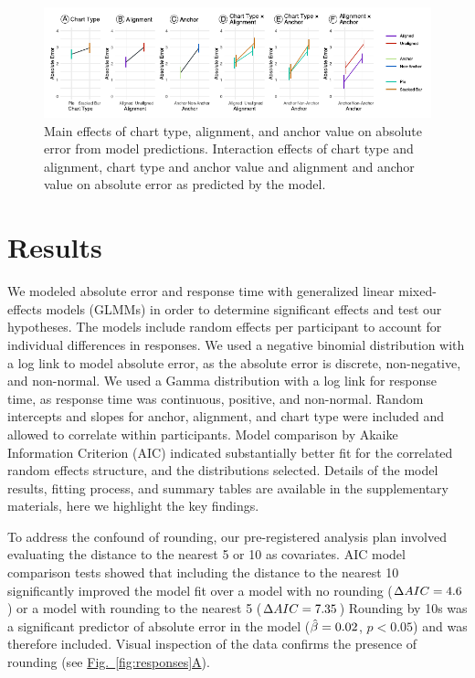 \documentclass[preprint]{vgtc}               %
\newcommand{\FlatCircledText}[1]{\smash{\CircledText{#1}}}
\newcommand{\subfigref}[2]{\hyperref[#1]{Fig.~\ref*{#1}#2}}
\begin{document}
\begin{figure}[t]
    \centering
    \includegraphics[width=\textwidth]{resultsFigure.pdf}
    \caption{Main effects of \FlatCircledText{A} chart type, \FlatCircledText{B} alignment, and \FlatCircledText{C} anchor value on absolute error from model predictions. Interaction effects of \FlatCircledText{D} chart type and alignment, \FlatCircledText{E} chart type and anchor value and \FlatCircledText{F} alignment and anchor value on absolute error as predicted by the model.}
    \label{fig:results}
\end{figure}

\section{Results}
We modeled absolute error and response time with generalized linear mixed-effects models (GLMMs) in order to determine significant effects and test our hypotheses.
The models include random effects per participant to account for individual differences in responses.
We used a negative binomial distribution with a log link to model absolute error, as the absolute error is discrete, non-negative, and non-normal. 
We used a Gamma distribution with a log link for response time, as response time was continuous, positive, and non-normal.
Random intercepts and slopes for anchor, alignment, and chart type were included and allowed to correlate within participants. 
Model comparison by Akaike Information Criterion (AIC) indicated substantially better fit for the correlated random effects structure, and the distributions selected.
Details of the model results, fitting process, and summary tables are available in the supplementary materials, here we highlight the key findings. 

To address the confound of rounding, our pre-registered analysis plan involved evaluating the distance to the nearest 5 or 10 as covariates.
AIC model comparison tests showed that including the distance to the nearest 10 significantly improved the model fit over a model with no rounding ($\smash{\Delta AIC}=4.6$) or a model with rounding to the nearest 5 ($\smash{\Delta AIC}=7.35$)
Rounding by 10s was a significant predictor of absolute error in the model ($\smash{\hat{\beta}} = 0.02$, $p<0.05$) and was therefore included.
Visual inspection of the data confirms the presence of rounding (see \subfigref{fig:responses}{A}).
\end{document}
